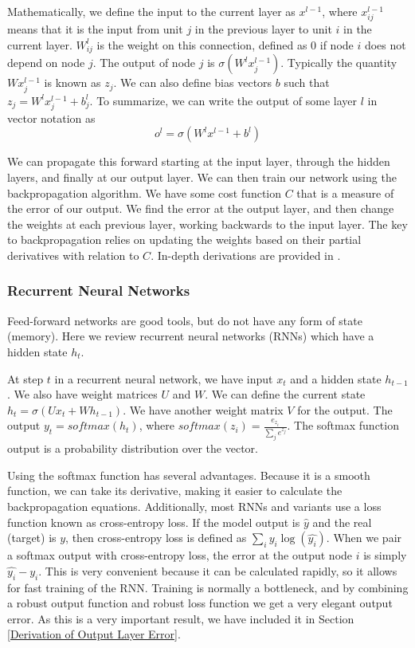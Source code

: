 \documentclass[pageno]{final_paper}
\begin{document}
Mathematically, we define the input to the current layer as $x^{l-1}$,
where $x^{l-1}_{ij}$ means that it is the input from unit $j$ in the previous
layer to unit $i$ in the current layer. $W^l_{ij}$ is the weight on this
connection, defined as 0 if node $i$ does not depend on node $j$. The output of
node $j$ is $\sigma ( W^l x^{l-1}_j)$. Typically the quantity $Wx^{l-1}_j$ is
known as $z_j$. We can also define bias vectors $b$ such that $z_j =
W^lx^{l-1}_j + b^l_j$. To summarize, we can write the output of some layer $l$
in vector notation as
$$o^l = \sigma(W^lx^{l-1} + b^l)$$

We can propagate this forward starting at the input layer, through the hidden
layers, and finally at our output layer. We can then train our network using the
backpropagation algorithm. We have some cost function $C$ that is a measure of
the error of our output. We find the error at the output layer, and then change
the weights at each previous layer, working backwards to the input layer. The
key to backpropagation relies on updating the weights based on their partial
derivatives with relation to $C$. In-depth derivations are provided in
\cite{Bishop1995, Nielsen2015}.\\

\subsubsection{Recurrent Neural Networks}
\label{Recurrent Neural Networks}

Feed-forward networks are good tools, but do not have any form of state
(memory). Here we review recurrent neural networks (RNNs) which have a hidden
state $h_t$.

At step $t$ in a recurrent neural network, we have input $x_t$ and a hidden
state $h_{t-1}$. We also have weight matrices $U$ and $W$. We can define the
current state $h_t = \sigma(Ux_t + Wh_{t-1})$. We have another weight matrix $V$
for the output. The output $y_t = softmax(h_t)$, where $softmax(z_i) =
\frac{e_{z_i}}{\sum_j e^{z_j}}$. The softmax function output is a probability
distribution over the vector.

Using the softmax function has several advantages. Because it is a smooth
function, we can take its derivative, making it easier to calculate the
backpropagation equations. Additionally, most RNNs and variants use a loss
function known as cross-entropy loss. If the model output is $\hat{y}$ and the
real (target) is $y$, then cross-entropy loss is defined as $\sum_i y_i
\log(\hat{y_{i}})$. When we pair a softmax output with cross-entropy loss, the
error at the output node $i$ is simply $\hat{y_i} - y_i$. This is very
convenient because it can be calculated rapidly, so it allows for fast training
of the RNN. Training is normally a bottleneck, and by combining a robust output
function and robust loss function we get a very elegant output error. As this is
a very important result, we have included it in Section \ref{Derivation of
Output Layer Error}.
\end{document}
